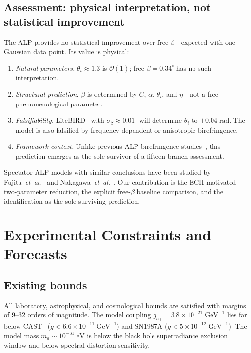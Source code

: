 \documentclass[aps,prd,twocolumn,superscriptaddress,showpacs,preprintnumbers,nofootinbib,longbibliography,floatfix]{revtex4-2}
\newcommand{\etal}{\textit{et~al.}}
\begin{document}
\subsection{Assessment: physical interpretation, not statistical improvement}

The ALP provides no statistical improvement over free $\beta$---expected with
one Gaussian data point.  Its value is physical:
%
\begin{enumerate}[leftmargin=*]
\item \emph{Natural parameters.}  $\theta_i \approx 1.3$ is $\mathcal{O}(1)$;
  free $\beta = 0.34^\circ$ has no such interpretation.
\item \emph{Structural prediction.}  $\beta$ is determined by $C$, $\alpha$,
  $\theta_i$, and $\eta$---not a free phenomenological parameter.
\item \emph{Falsifiability.}  LiteBIRD~\cite{LiteBIRD} with
  $\sigma_\beta \approx 0.01^\circ$ will determine $\theta_i$ to
  $\pm 0.04\;\mathrm{rad}$.  The model is also falsified by
  frequency-dependent or anisotropic birefringence.
\item \emph{Framework context.}  Unlike previous ALP birefringence
  studies~\cite{Fujita2021,Nakagawa2025,LinYanagida2023}, this prediction
  emerges as the sole survivor of a fifteen-branch assessment.
\end{enumerate}

Spectator ALP models with similar conclusions have been studied
by Fujita~\etal~\cite{Fujita2021} and
Nakagawa~\etal~\cite{Nakagawa2025}.  Our contribution is the
ECH-motivated two-parameter reduction, the explicit free-$\beta$ baseline
comparison, and the identification as the sole surviving prediction.


\section{Experimental Constraints and Forecasts}\label{sec:forecasts}

\subsection{Existing bounds}

All laboratory, astrophysical, and cosmological bounds are satisfied with
margins of 9--32 orders of magnitude.  The model coupling
$g_{a\gamma} = 3.8 \times 10^{-21}\;\mathrm{GeV}^{-1}$ lies far below
CAST~\cite{CAST2017} ($g < 6.6 \times 10^{-11}\;\mathrm{GeV}^{-1}$) and
SN1987A ($g < 5 \times 10^{-12}\;\mathrm{GeV}^{-1}$).  The model mass
$m_a \sim 10^{-31}\;\mathrm{eV}$ is below the black hole superradiance
exclusion window and below spectral distortion sensitivity.
\end{document}
